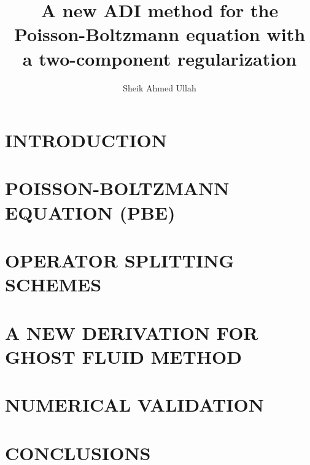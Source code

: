\documentclass[dissertation]{uathesis}
\author{Sheik Ahmed Ullah}       %
\title{A new ADI method for the Poisson-Boltzmann equation with \protect\\ a two-component regularization}
\begin{document}
\makefrontmatter


\begin{body}

\chapter{INTRODUCTION}
\label{chap: introduction}



\chapter{POISSON-BOLTZMANN EQUATION (PBE)}
\label{chap: PBE}


\chapter{OPERATOR SPLITTING SCHEMES}
\label{chap:opt_split}

\chapter{A NEW DERIVATION FOR GHOST FLUID METHOD}
\label{chap:new_GFM}


\chapter{NUMERICAL VALIDATION}
\label{chap:num_vald}
 

\chapter{CONCLUSIONS}
\label{chap: conclusions}



\end{body}
\end{document}
